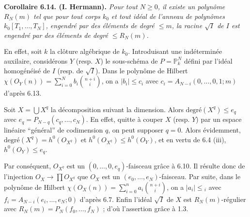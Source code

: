 
\textbf{Corollaire 6.14. (I. Hermann).} \emph{Pour tout $N\ge0$, il existe un polyn\^ome $R_N(m)$ tel que pour tout corps $k_0$ et tout id\'eal de l'anneau de polyn\^omes $k_0[T_1,\ldots,T_N]$, engendr\'e par des \'el\'ements de degr\'e $\le m$, la racine $\sqrt I$ de $I$ est engendr\'e par des \'el\'ements de degr\'e $\le R_N(m)$.}

En effet, soit $k$ la cl\^oture alg\'ebrique de $k_0$. Introduisant une ind\'etermin\'ee auxilaire, consid\'erons $Y$ (resp. $X$) le sous-sch\'ema de $P=\mathbb P^N_k$ d\'efini par l'id\'eal homog\'en\'eis\'e de $I$ (resp. de $\sqrt I$). Dans le polyn\^ome de Hilbert $\chi({O}_Y(n))=\sum_{i=0}^{N}b_i\binom{n+i}{i}$, on a $|b_i|\le c_i$ avec $c_i=A_{N-i}(0,\ldots,0,1;m)$ d'apr\`es 6.13.

Soit $X=\bigcup X^q$ la d\'ecomposition suivant la dimension. Alors $\text{degr\'e}(X^q)\le e_q$ avec $e_q=P_{N-q}(c_q,\ldots,c_N)$. En effet, quitte \`a couper $X$ (resp. $Y$) par un espace lin\'eaire ``g\'en\'eral'' de codimension $q$, on peut supposer $q=0$. Alors \'evidemment, $\text{degr\'e}(X^q)=h^0({O}_{X^q})$ et $h^0({O}_{X^q})\le h^0({O}_Y)$, et en vertu de 6.4 (iii), $h^0({O}_Y)\le e_q$.

Par cons\'equent, ${O}_{X^q}$ est un $(0,\ldots,0,e_q)$-faisceau gr\^ace \`a 6.10. Il r\'esulte donc de l'injection ${O}_X\to \prod{O}_{X^q}$ que ${O}_X$ est un $(e_0,\ldots,e_N)$-faisceau. Par suite, dans le polyn\^ome de Hilbert $\chi({O}_X(n))=\sum_{i=0}^{n}a_i\binom{n+i}{i}$, on a $|a_i|\le {}_i$ avec $f_i=A_{N-i}(e_i,\ldots,e_N;0)$ d'apr\`es 6.7. Enfin l'id\'eal $\sqrt I$ de $X$ est $R_N(m)$-r\'egulier avec $R_N(m)=P_N(f_0,\ldots,f_N)$ ; d'o\`u l'assertion gr\^ace \`a 1.3.

